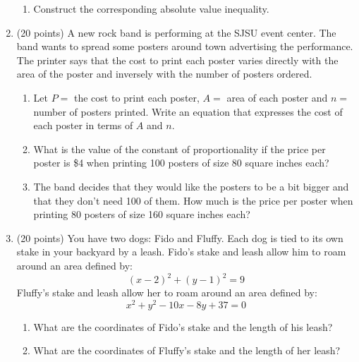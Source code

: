 \documentclass[letterpaper,12pt,fleqn]{article}
\begin{document}
\begin{enumerate}
\begin{enumerate}
  \item Construct the corresponding absolute value inequality.
    
  \end{enumerate}

  \newpage
  
\item (20 points) A new rock band is performing at the SJSU event center. The
  band wants to spread some posters around town advertising the performance.
  The printer says that the cost to print each poster varies directly with the
  area of the poster and inversely with the number of posters ordered.
  \begin{enumerate}
  \item Let $P=$ the cost to print each poster, $A=$ area of each poster and
    $n=$ number of posters printed. Write an equation that expresses the cost
    of each poster in terms of $A$ and $n$.

    \vspace{2in}

  \item What is the value of the constant of proportionality if the price per
    poster is \$4 when printing 100 posters of size 80 square inches each?

    \vspace{2in}

  \item The band decides that they would like the posters to be a bit bigger
    and that they don't need 100 of them. How much is the price per poster when
    printing 80 posters of size 160 square inches each?
  \end{enumerate}

  \newpage

\item (20 points) You have two dogs: Fido and Fluffy. Each dog is tied to its
own stake in your backyard by a leash. Fido's stake and leash allow him to roam
around an area defined by:
\[(x-2)^2+(y-1)^2=9\]
Fluffy's stake and leash allow her to roam around an area defined by:
\[x^2+y^2-10x-8y+37=0\]
\begin{enumerate}
\item What are the coordinates of Fido's stake and the length of his leash?

\vspace{0.5in}

\item What are the coordinates of Fluffy's stake and the length of her leash?


\end{enumerate}
\end{enumerate}
\end{document}
